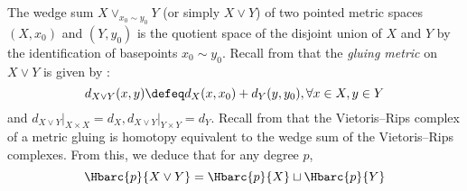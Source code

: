 
The wedge sum $X\vee_{x_0\sim y_0} Y$ (or simply $X\vee Y$) of two pointed metric spaces $(X,x_0)$ and $(Y,y_0)$ is the quotient space of the disjoint union of $X$ and $Y$ by the identification of basepoints $x_0\sim y_0$. 
Recall from \cite{burago2001course,adamaszek2020homotopy} that the \emph{gluing metric} on $X\vee Y$ is given by \label{para:gluing}:
	$$d_{X\vee Y}(x,y)\defeq d_X(x,x_0)+d_Y(y,y_0),\forall x\in X, y\in Y$$ 
and $d_{X\vee Y}\vert_{X\times X}=d_X,d_{X\vee Y}\vert_{Y\times Y}=d_Y$.
Recall from \cite[Prop.~3.7]{adamaszek2020homotopy} that the Vietoris--Rips complex of a metric gluing is homotopy equivalent to the wedge sum of the Vietoris--Rips complexes. From this, we deduce that for any degree $p$,
\begin{equation}\label{eq:wedge sum}
\Hbarc{p}{X\vee Y}= \Hbarc{p}{X}\sqcup \Hbarc{p}{Y}
\end{equation}

